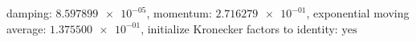 damping: $\num[scientific-notation=true]{8.597899e-05}$, momentum: $\num[scientific-notation=true]{2.716279e-01}$, exponential moving average: $\num[scientific-notation=true]{1.375500e-01}$, initialize Kronecker factors to identity: $\text{yes}$